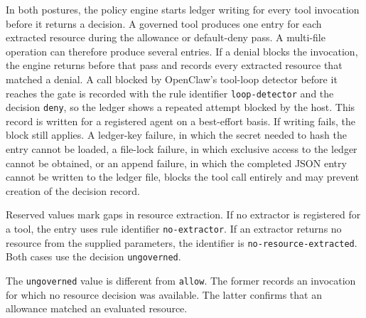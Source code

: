 {\color{red}In both postures, the policy engine starts ledger writing for
every tool invocation before it returns a decision.} A governed tool produces one
entry for each extracted resource during the allowance or default-deny pass. A
multi-file operation can therefore produce several entries. If a denial blocks
the invocation, the engine returns before that pass and records every extracted
resource that matched a denial. {\color{red}A call blocked by OpenClaw's tool-loop
detector before it reaches the gate is recorded with the rule
identifier \texttt{loop-detector} and the decision \texttt{deny}, so the ledger
shows a repeated attempt blocked by the host. This record is written for a
registered agent on a best-effort basis. If writing fails, the block
still applies.} A ledger-key failure, in which the secret needed to hash the entry cannot be loaded, a file-lock failure, in which exclusive access to the ledger cannot be obtained, or an append failure, in which the completed JSON entry cannot be written to the ledger file, blocks the tool call entirely and may prevent creation of the decision record.

Reserved values mark gaps in resource extraction. If no extractor is registered
for a tool, the entry uses rule identifier \texttt{no-extractor}. If an
extractor returns no resource from the supplied parameters, the identifier is
\texttt{no-resource-extracted}. Both cases use the decision
\texttt{ungoverned}.

The \texttt{ungoverned} value is different from \texttt{allow}. The former
records an invocation for which no resource decision was available. The latter
confirms that an allowance matched an evaluated resource.

